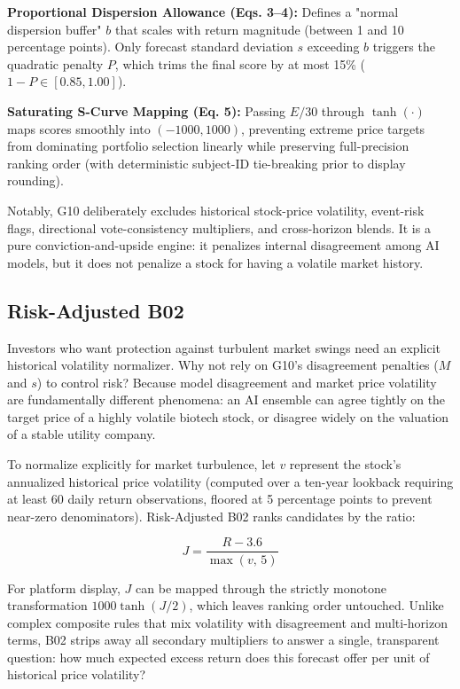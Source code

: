 \documentclass[11pt,a4paper]{article}
\numberwithin{table}{section}
\begin{document}
\textbf{Proportional Dispersion Allowance (Eqs. 3--4):}  Defines a "normal dispersion buffer" $b$ that scales with return magnitude (between 1 and 10 percentage points). Only forecast standard deviation $s$ exceeding $b$ triggers the quadratic penalty $P$, which trims the final score by at most 15\% ($1 - P \in [0.85, 1.00]$).

\textbf{Saturating S-Curve Mapping (Eq. 5):}  Passing $E/30$ through $\tanh(\cdot)$ maps scores smoothly into $(-1000, 1000)$, preventing extreme price targets from dominating portfolio selection linearly while preserving full-precision ranking order (with deterministic subject-ID tie-breaking prior to display rounding).

Notably, G10 deliberately excludes historical stock-price volatility, event-risk flags, directional vote-consistency multipliers, and cross-horizon blends. It is a pure conviction-and-upside engine: it penalizes internal disagreement among AI models, but it does not penalize a stock for having a volatile market history.

\subsection{Risk-Adjusted B02}

Investors who want protection against turbulent market swings need an explicit historical volatility normalizer. Why not rely on G10's disagreement penalties ($M$ and $s$) to control risk? Because model disagreement and market price volatility are fundamentally different phenomena: an AI ensemble can agree tightly on the target price of a highly volatile biotech stock, or disagree widely on the valuation of a stable utility company.

To normalize explicitly for market turbulence, let $v$ represent the stock's annualized historical price volatility (computed over a ten-year lookback requiring at least 60 daily return observations, floored at 5 percentage points to prevent near-zero denominators). Risk-Adjusted B02 ranks candidates by the ratio:

\begin{equation}J = \frac{R - 3.6}{\max(v,\, 5)} \end{equation}

For platform display, $J$ can be mapped through the strictly monotone transformation $1000\tanh(J/2)$, which leaves ranking order untouched. Unlike complex composite rules that mix volatility with disagreement and multi-horizon terms, B02 strips away all secondary multipliers to answer a single, transparent question: how much expected excess return does this forecast offer per unit of historical price volatility?
\end{document}
